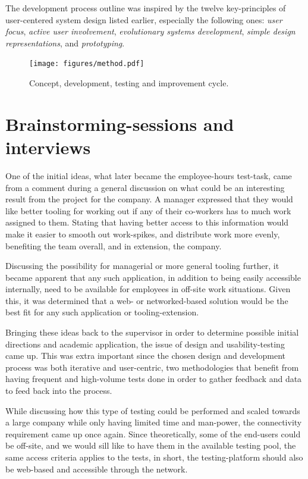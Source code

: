 
The development process outline was inspired by the
twelve key-principles of user-centered system design
listed earlier, especially the following ones:
\textit{user focus},
\textit{active user involvement},
\textit{evolutionary systems development},
\textit{simple design representations},
and
\textit{prototyping}.

\begin{figure}[h!]
  \centering
  \texttt{[image: figures/method.pdf]}
  \caption{Concept, development, testing and improvement cycle.}
\end{figure}

\section{Brainstorming-sessions and interviews}{\label{label_sectionIdeas}

One of the initial ideas, what later became the employee-hours test-task, came
from a comment during a general discussion on what could be an interesting
result from the project for the company. A manager expressed that they would
like better tooling for working out if any of their co-workers has to much work
assigned to them. Stating that having better access to this information would
make it easier to smooth out work-spikes, and distribute work more evenly,
benefiting the team overall, and in extension, the company.

Discussing the possibility for managerial or more general tooling further, it
became apparent that any such application, in addition to being easily
accessible internally, need to be available for employees in off-site work
situations. Given this, it was determined that a web- or networked-based
solution would be the best fit for any such application or tooling-extension.

Bringing these ideas back to the supervisor in order to determine possible
initial directions and academic application, the issue of design and
usability-testing came up. This was extra important since the
chosen design and development process was both iterative and user-centric, two
methodologies that benefit from having frequent and high-volume tests done in
order to gather feedback and data to feed back into the process.

While discussing how this type of testing could be performed and scaled towards
a large company while only having limited time and man-power, the connectivity
requirement came up once again. Since theoretically, some of the end-users
could be off-site, and we would sill like to have them in the available testing
pool, the same access criteria applies to the tests, in short, the
testing-platform should also be web-based and accessible through the network.

}
